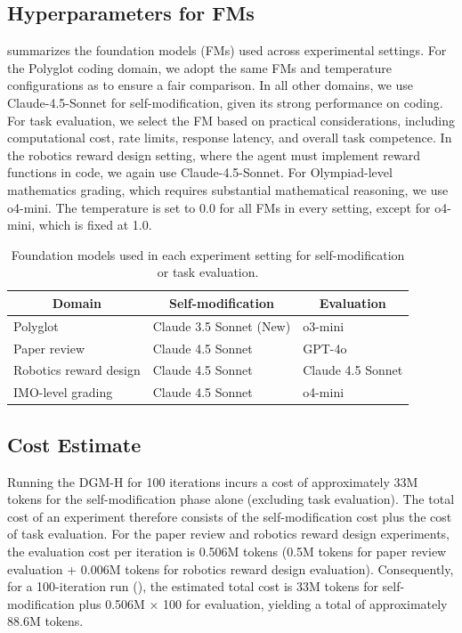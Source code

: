 \documentclass{article}
\begin{document}
\subsection{Hyperparameters for FMs}
\label{app:fm-hyperparam}

 summarizes the foundation models (FMs) used across experimental settings. For the Polyglot coding domain, we adopt the same FMs and temperature configurations as \citet{zhang2025darwin} to ensure a fair comparison. In all other domains, we use Claude-4.5-Sonnet for self-modification, given its strong performance on coding. For task evaluation, we select the FM based on practical considerations, including computational cost, rate limits, response latency, and overall task competence. In the robotics reward design setting, where the agent must implement reward functions in code, we again use Claude-4.5-Sonnet. For Olympiad-level mathematics grading, which requires substantial mathematical reasoning, we use o4-mini. The temperature is set to 0.0 for all FMs in every setting, except for o4-mini, which is fixed at 1.0.

\begin{table}[H]
\centering
\caption{Foundation models used in each experiment setting for self-modification or task evaluation.}
\label{tab:fm-hyperparam}
\begin{tabular}{@{}lll@{}}
\toprule
\multicolumn{1}{c}{\textbf{Domain}} & \multicolumn{1}{c}{\textbf{Self-modification}} & \multicolumn{1}{c}{\textbf{Evaluation}} \\ \midrule
Polyglot & Claude 3.5 Sonnet (New) & o3-mini \\
Paper review & Claude 4.5 Sonnet & GPT-4o \\
Robotics reward design & Claude 4.5 Sonnet & Claude 4.5 Sonnet \\
IMO-level grading & Claude 4.5 Sonnet & o4-mini \\ \bottomrule
\end{tabular}
\end{table}

\subsection{Cost Estimate}
\label{app:cost-estimate}
Running the DGM-H for 100 iterations incurs a cost of approximately 33M tokens for the self-modification phase alone (excluding task evaluation). The total cost of an experiment therefore consists of the self-modification cost plus the cost of task evaluation. For the paper review and robotics reward design experiments, the evaluation cost per iteration is 0.506M tokens (0.5M tokens for paper review evaluation + 0.006M tokens for robotics reward design evaluation). Consequently, for a 100-iteration run (), the estimated total cost is 33M tokens for self-modification plus 0.506M × 100 for evaluation, yielding a total of approximately 88.6M tokens.
\end{document}
